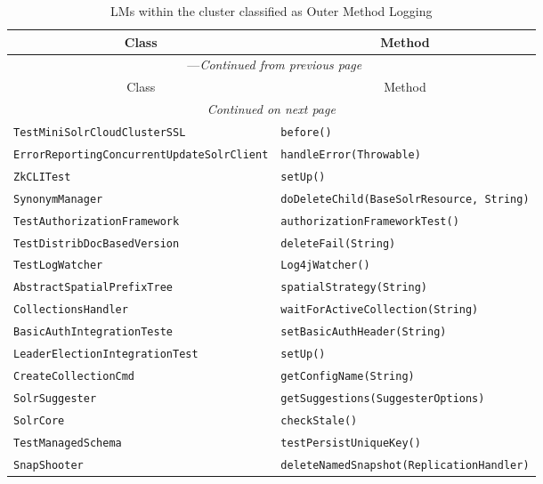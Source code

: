 \begin{center}
\begin{longtable}{ll}
\caption{LMs within the cluster classified as Outer Method Logging}\\
\toprule\multicolumn{1}{c}{Class}&\multicolumn{1}{c}{Method}\\\midrule
\endfirsthead

\multicolumn{2}{c}{\tablename\ \thetable{}---\textit{Continued from previous page}} \\\midrule
\multicolumn{1}{c}{Class}&\multicolumn{1}{c}{Method}\\\midrule
\endhead
\multicolumn{2}{c}{\textit{Continued on next page}}\\\midrule
\endfoot
\bottomrule
\endlastfoot

\lstinline/TestMiniSolrCloudClusterSSL/&{\lstinline/before()/}\\
\lstinline/ErrorReportingConcurrentUpdateSolrClient/&{\lstinline/handleError(Throwable)/}\\
\lstinline/ZkCLITest/&{\lstinline/setUp()/}\\
\lstinline/SynonymManager/&{\lstinline/doDeleteChild(BaseSolrResource, String)/}\\
\lstinline/TestAuthorizationFramework/&{\lstinline/authorizationFrameworkTest()/}\\
\lstinline/TestDistribDocBasedVersion/&{\lstinline/deleteFail(String)/}\\
\lstinline/TestLogWatcher/&{\lstinline/Log4jWatcher()/}\\
\lstinline/AbstractSpatialPrefixTree/&{\lstinline/spatialStrategy(String)/}\\
\lstinline/CollectionsHandler/&{\lstinline/waitForActiveCollection(String)/}\\
\lstinline/BasicAuthIntegrationTeste/&{\lstinline/setBasicAuthHeader(String)/}\\
\lstinline/LeaderElectionIntegrationTest/&{\lstinline/setUp()/}\\
\lstinline/CreateCollectionCmd/&{\lstinline/getConfigName(String)/}\\
\lstinline/SolrSuggester/&{\lstinline/getSuggestions(SuggesterOptions)/}\\
\lstinline/SolrCore/&{\lstinline/checkStale()/}\\
\lstinline/TestManagedSchema/&{\lstinline/testPersistUniqueKey()/}\\
\lstinline/SnapShooter/&{\lstinline/deleteNamedSnapshot(ReplicationHandler)/}\\

\end{longtable}
\end{center}
